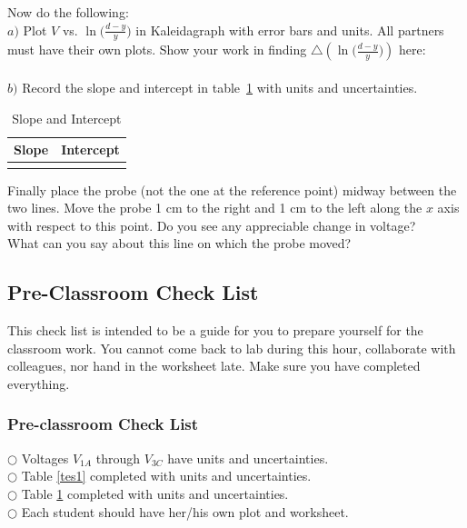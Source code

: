 {{\noindent Now do the following:\\
$a)$ Plot $V$ vs. $\ln\big({\frac{d-y}{y}}\big)$ in Kaleidagraph
with error bars and units.  All partners must have their own
plots. Show your
work in finding $\bigtriangleup\left(\ln{\big(\frac{d-y}{y}\big)}\right)$ here:\\
\vspace{8cm}\\
\noindent$b)$ Record the slope and intercept in table~\ref{tes2}
with units and uncertainties.\\
\begin{table}
\hspace{2cm}\begin{tabular}{|c|c|}\hline
\hspace{1cm} Slope \hspace{1cm} & \hspace{1cm} Intercept \hspace{1cm} \\
\hline
\hspace{4cm} & \hspace{4cm}\\
\hline
\end{tabular}
\caption{Slope and Intercept} \label{tes2}
\end{table}

 \noindent Finally place the probe (not the one at
the reference point) midway between the two lines.  Move the probe
1 cm to the right and 1 cm to the left along the $x$ axis with
respect to this point. Do you see any appreciable change in voltage? \\
What can you say about this line on which the probe moved?
\vspace{2cm}

\subsection{Pre-Classroom Check List}
\noindent This check list is intended to be a guide for you to
prepare yourself for the classroom work.  You cannot come back
to lab during this hour, collaborate with colleagues, nor hand in
the worksheet late.  Make sure you have completed everything.
\subsubsection{Pre-classroom Check List}
$\bigcirc$ \hspace{1cm} Voltages $V_{1A}$ through $V_{3C}$ have
units and uncertainties.\\
$\bigcirc$ \hspace{1cm} Table \ref{tes1} completed with units and
uncertainties.\\
$\bigcirc$ \hspace{1cm} Table \ref{tes2} completed with units and
uncertainties.\\
$\bigcirc$ \hspace{1cm} Each student should have her/his own plot
and worksheet.

}}
